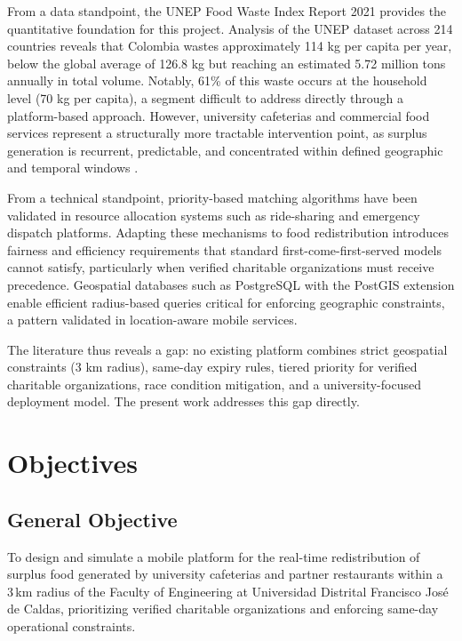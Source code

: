 \documentclass[conference]{IEEEtran}
\begin{document}
From a data standpoint, the UNEP Food Waste Index Report 2021 provides the quantitative foundation for this project. Analysis of the UNEP dataset across 214 countries reveals that Colombia wastes approximately 114 kg per capita per year, below the global average of 126.8 kg but reaching an estimated 5.72 million tons annually in total volume. Notably, 61\% of this waste occurs at the household level (70 kg per capita), a segment difficult to address directly through a platform-based approach. However, university cafeterias and commercial food services represent a structurally more tractable intervention point, as surplus generation is recurrent, predictable, and concentrated within defined geographic and temporal windows \cite{unep2021}.

From a technical standpoint, priority-based matching algorithms have been validated in resource allocation systems such as ride-sharing and emergency dispatch platforms. Adapting these mechanisms to food redistribution introduces fairness and efficiency requirements that standard first-come-first-served models cannot satisfy, particularly when verified charitable organizations must receive precedence. Geospatial databases such as PostgreSQL with the PostGIS extension enable efficient radius-based queries critical for enforcing geographic constraints, a pattern validated in location-aware mobile services.

The literature thus reveals a gap: no existing platform combines strict geospatial constraints (3 km radius), same-day expiry rules, tiered priority for verified charitable organizations, race condition mitigation, and a university-focused deployment model. The present work addresses this gap directly.

\section{Objectives}

\subsection{General Objective}

To design and simulate a mobile platform for the real-time redistribution of surplus food generated by university cafeterias and partner restaurants within a 3\,km radius of the Faculty of Engineering at Universidad Distrital Francisco José de Caldas, prioritizing verified charitable organizations and enforcing same-day operational constraints.
\end{document}
